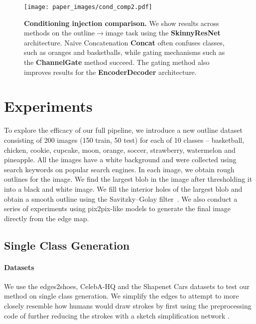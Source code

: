 \begin{figure}[t]
    \centering
    \texttt{[image: paper\_images/cond\_comp2.pdf]}
    \caption{{\bf Conditioning injection comparison.} We show results across methods on the outline$\rightarrow$image task using the \textbf{SkinnyResNet} architecture. Naive Concatenation \textbf{Concat} often confuses classes, such as oranges and basketballs, while gating mechanisms such as the \textbf{ChannelGate} method succeed. The gating method also improves results for the \textbf{EncoderDecoder} architecture. \label{fig:alg_comp} }
    \vspace{-4mm}
\end{figure}


\section{Experiments}
\label{sec:experiments}
To explore the efficacy of our full pipeline, we introduce a new outline dataset consisting of 200 images (150 train, 50 test) for each of 10 classes -- basketball, chicken, cookie, cupcake, moon, orange, soccer, strawberry,  watermelon and pineapple. All the images have a white background and were collected using search keywords on popular search engines.
In each image, we obtain rough outlines for the image. We find the largest blob in the image after thresholding it into a black and white image. We fill the interior holes of the largest blob and obtain a smooth outline using the Savitzky–Golay filter~\cite{savitzky1964smoothing}.
We also conduct a series of experiments using pix2pix-like models to generate the final image directly from the edge map.

\subsection{Single Class Generation}
\paragraph{Datasets} We use the edges2shoes\cite{isola2016image2image}, CelebA-HQ\cite{karras2017progressive} and the Shapenet Cars \cite{chang2015shapenet} datasets to test our method on single class generation. 
We simplify the edges to attempt to more closely resemble how humans would draw strokes by first using the preprocessing code of \cite{li2019im2pencil} further reducing the strokes with a sketch simplification network \cite{simo2016learning}.
